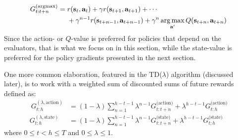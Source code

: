 \documentclass{article}
\DeclareMathOperator*{\argmax}{arg\,max}
\begin{document}
\begin{equation}
\begin{split}
G_{t:t+n}^{(\text{argmax})}&=r(\mathbf{s}_t,\mathbf{a}_t)+\gamma r(\mathbf{s}_{t+1},\mathbf{a}_{t+1})+\cdots\\&\nobreakspace\nobreakspace\nobreakspace\nobreakspace+\gamma^{n-1}r(\mathbf{s}_{t+n-1},\mathbf{a}_{t+n-1})+\gamma^n \argmax_{\mathbf{a}'}Q (\mathbf{s}_{t+n},\mathbf{a}_{t+n})\\\end{split}\end{equation}Since the action- or $Q$-value is preferred for policies that depend on the evaluators, that is what we focus on in this section, while the state-value is preferred for the policy gradients presented in the next section.

One more common elaboration, featured in the TD($\lambda$) algorithm (discussed later), is to work with a weighted sum of discounted sums of future rewards defined as:
\begin{equation}\begin{split}\
G_{t:h}^{(\lambda,\text{action})} &=(1-\lambda)\sum_{n=1}^{h-t-1}\lambda^{n-1}G_{t:t+n}^\text{(action)}+\lambda^{h-t-1}G_{t:h}^\text{(action)} \\G_{t:h}^{(\lambda,\text{state})} &=(1-\lambda)\sum_{n=1}^{h-t-1}\lambda^{n-1}G_{t:t+n}^\text{(state)}+\lambda^{h-t-1}G_{t:h}^\text{(state)} 
\end{split}\end{equation} where $0\leq t<h\leq T$ and $0\leq \lambda \leq 1$.
\end{document}
